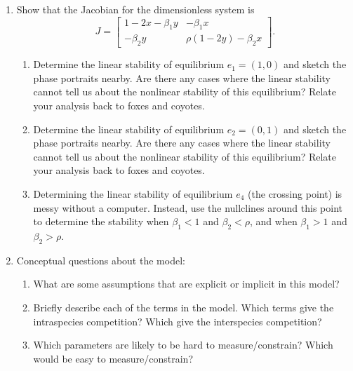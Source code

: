\documentclass[12pt]{amsart}
\theoremstyle{conjecture}
\theoremstyle{definition}
\theoremstyle{question}
\theoremstyle{theorem}
\begin{document}
\begin{enumerate}[leftmargin=2em]
\begin{enumerate}[label=(\alph*),leftmargin=2.2em]
        \item Show that the Jacobian for the dimensionless system is
        \[
            J=
            \begin{bmatrix}
                1-2x-\beta_1y & -\beta_1x\\
                -\beta_2y & \rho(1-2y)-\beta_2x
            \end{bmatrix}.
        \]
        \begin{enumerate}[label=\roman*.,leftmargin=2em]
            \item Determine the linear stability of equilibrium $e_1=(1,0)$ and
            sketch the phase portraits nearby. Are there any cases where the
            linear stability cannot tell us about the nonlinear stability of this
            equilibrium? Relate your analysis back to foxes and coyotes.
            \item Determine the linear stability of equilibrium $e_2=(0,1)$ and
            sketch the phase portraits nearby. Are there any cases where the
            linear stability cannot tell us about the nonlinear stability of this
            equilibrium? Relate your analysis back to foxes and coyotes.
            \item Determining the linear stability of equilibrium $e_4$ (the
            crossing point) is messy without a computer. Instead, use the
            nullclines around this point to determine the stability when
            $\beta_1<1$ and $\beta_2<\rho$, and when $\beta_1>1$ and
            $\beta_2>\rho$.
        \end{enumerate}

        \item Conceptual questions about the model:
        \begin{enumerate}[label=\roman*.,leftmargin=2em]
            \item What are some assumptions that are explicit or implicit in this
            model?
            \item Briefly describe each of the terms in the model. Which terms give
            the intraspecies competition? Which give the interspecies
            competition?
            \item Which parameters are likely to be hard to measure/constrain?
            Which would be easy to measure/constrain?
        \end{enumerate}


\end{enumerate}
\end{enumerate}
\end{document}
